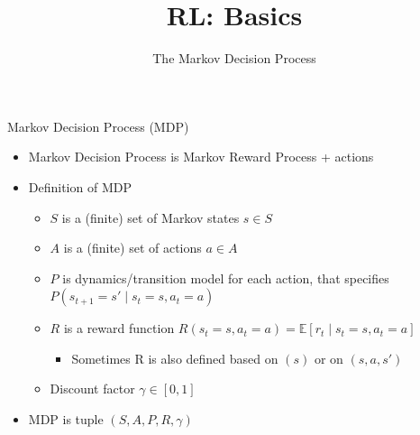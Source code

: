 \documentclass[aspectratio=169]{../latex_main/tntbeamer}  %
\title[Reinforcement Learning: Basics]{RL: Basics}
\subtitle{The Markov Decision Process}
\begin{document}
	
	\maketitle

\begin{frame}[c]{Markov Decision Process (MDP)}

\begin{itemize}
	\item Markov Decision Process is Markov Reward Process + actions
	\item Definition of MDP
	\begin{itemize}
		\item $S$ is a (finite) set of Markov states $s \in S$
		\item $A$ is a (finite) set of actions $a \in A$
		\item $P$ is dynamics/transition model for each action, that specifies $P(s_{t+1} = s' \mid s_t=s, a_t=a)$
		\item $R$ is a reward function 
		$R(s_t=s, a_t=a) = \mathbb{E}[r_t \mid s_t=s, a_t=a] $
		\begin{itemize}
			\item Sometimes R is also defined based on $(s)$ or on $(s,a,s')$
		\end{itemize}
		\item Discount factor $\gamma \in [0, 1]$
	\end{itemize}
	\item MDP is tuple $(S,A,P, R, \gamma)$
\end{itemize}

\end{frame}
\end{document}
